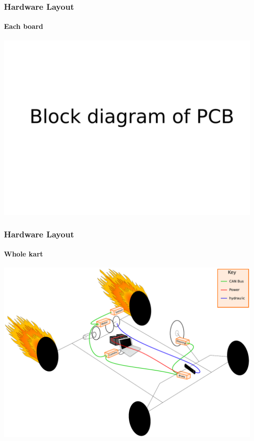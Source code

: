 \documentclass{beamer}
\begin{document}
\begin{frame}
\frametitle{Hardware Layout}
\framesubtitle{Each board}
    \begin{center}
      \includegraphics[width=.95\textwidth]{Images/Hardware_block}
    \end{center}
\end{frame}

\begin{frame}
\frametitle{Hardware Layout}
\framesubtitle{Whole kart}
    \begin{center}
      \includegraphics[width=.95\textwidth]{Images/layout}
    \end{center}
\end{frame}
\end{document}
